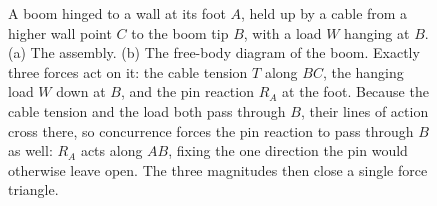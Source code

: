 \begin{figure}[htbp]
\caption[A boom held by a cable with a wall pin]{A boom hinged to a wall
at its foot $A$, held up by a cable from a higher wall point $C$ to the
boom tip $B$, with a load $W$ hanging at $B$. (a) The assembly. (b) The
free-body diagram of the boom. Exactly three forces act on it: the cable
tension $T$ along $BC$, the hanging load $W$ down at $B$, and the pin
reaction $R_A$ at the foot. Because the cable tension and the load both
pass through $B$, their lines of action cross there, so concurrence forces
the pin reaction to pass through $B$ as well: $R_A$ acts along $AB$,
fixing the one direction the pin would otherwise leave open. The three
magnitudes then close a single force triangle.}
\label{fig:vol03ch01:boom-wall-pin}
\end{figure}
